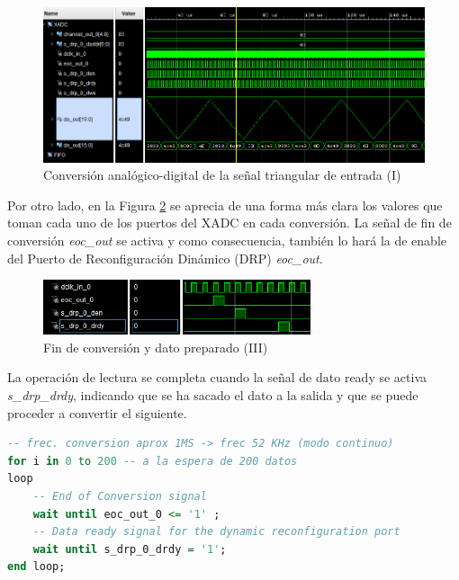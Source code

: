 \vspace{3mm}

\begin{figure}[h]
    \centering
    \includegraphics[width=1\textwidth]{img/simu/xadc.PNG}
    \caption{Conversión analógico-digital de la señal triangular de entrada (I)}
    \label{fig:xadc}
\end{figure}

\vspace{3mm}
\pagebreak

Por otro lado, en la Figura \ref{fig:xadc2} se aprecia de una forma más clara los valores que toman cada uno de los puertos del XADC en cada conversión. La señal de fin de conversión \textit{eoc\_out} se activa y como consecuencia, también lo hará la de enable del Puerto de Reconfiguración Dinámico (DRP) \textit{eoc\_out}. 

\vspace{3mm}

\begin{figure}[h]
    \centering
    \includegraphics[width=0.7\textwidth]{img/simu/xadc2.PNG}
    \caption{Fin de conversión y dato preparado (III)}
    \label{fig:xadc2}
\end{figure}

\vspace{3mm}

La operación de lectura se completa cuando la señal de dato ready se activa \textit{s\_drp\_drdy}, indicando que se ha sacado el dato a la salida y que se puede proceder a convertir el siguiente.

\vspace{3mm}

\begin{lstlisting}[language=VHDL, style=mystyle, caption={Bucle de conversión de los 200 datos}]
-- frec. conversion aprox 1MS -> frec 52 KHz (modo continuo)
for i in 0 to 200 -- a la espera de 200 datos 
loop     
    -- End of Conversion signal 
    wait until eoc_out_0 <= '1' ; 
    -- Data ready signal for the dynamic reconfiguration port  
    wait until s_drp_0_drdy = '1'; 
end loop;
\end{lstlisting}

